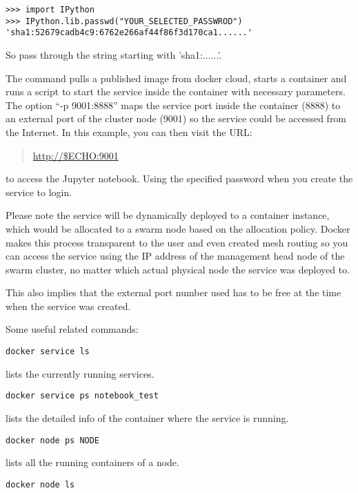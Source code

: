 \begin{lstlisting}
>>> import IPython
>>> IPython.lib.passwd("YOUR_SELECTED_PASSWROD")
'sha1:52679cadb4c9:6762e266af44f86f3d170ca1......'
\end{lstlisting}

So pass through the string starting with 'sha1:......'.

The command pulls a published image from docker cloud, starts a container and
runs a script to start the service inside the container with necessary
parameters. The option ``-p 9001:8888'' maps the service port inside the
container (8888) to an external port of the cluster node (9001) so the
service could be accessed from the Internet. In this example, you can
then visit the URL:

\begin{quote}
\url{http://$ECHO:9001}
\end{quote}

to access the Jupyter notebook. Using the specified password when you
create the service to login.

Please note the service will be dynamically deployed to a container
instance, which would be allocated to a swarm node based on the
allocation policy. Docker makes this process transparent to the user and
even created mesh routing so you can access the service using the IP
address of the management head node of the swarm cluster, no matter
which actual physical node the service was deployed to.

This also implies that the external port number used has to be free at
the time when the service was created.

Some useful related commands:


\begin{lstlisting}
docker service ls
\end{lstlisting}

lists the currently running services.

\begin{lstlisting}
docker service ps notebook_test
\end{lstlisting}

lists the detailed info of the container where the service is running.

\begin{lstlisting}
docker node ps NODE
\end{lstlisting}

lists all the running containers of a node.

\begin{lstlisting}
docker node ls
\end{lstlisting}

